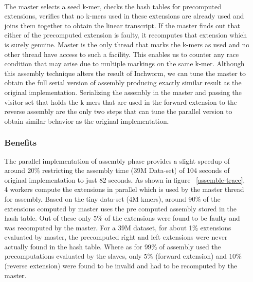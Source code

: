 \label{key}\documentclass[plainarticle, english ,zihtitle,final,hyperref,utf8]{zihpub}
\begin{document}
\paragraph{}
The master selects a seed k-mer, checks the hash tables for precomputed extensions, verifies that no k-mers used in these extensions are already used and joins them together to obtain the linear transcript. If the master finds out that either of the precomputed extension is faulty, it recomputes that extension which is surely genuine. Master is the only thread that marks the k-mers as used and no other thread have access to such a facility. This enables us to counter any race condition that may arise due to multiple markings on the same k-mer. Although this assembly technique alters the result of Inchworm, we can tune the master to obtain the full serial version of assembly producing exactly similar result as the original implementation. Serializing the assembly in the master and passing the visitor set that holds the k-mers that are used in the forward extension to the reverse assembly are the only two steps that can tune the parallel version to obtain similar behavior as the original implementation.
\subsubsection{Benefits}
The parallel implementation of assembly phase provides a slight speedup of around 20\% restricting the assembly time (39M Data-set) of 104 seconds of original implementation to just 82 seconds. As shown in figure ~\ref{assemble-trace}, 4 workers compute the extensions in parallel which is used by the master thread for assembly. Based on the tiny data-set (4M kmers), around 90\% of the extensions computed by master uses the pre computed assembly stored in the hash table. Out of these only 5\% of the extensions were found to be faulty and was recomputed by the master.  For a 39M dataset, for about 1\% extensions evaluated by master, the precomputed right and left extensions were never actually found in the hash table. Where as for 99\% of assembly used the precomputations evaluated by the slaves, only  5\% (forward extension) and 10\%(reverse extension) were found to be invalid and had to be recomputed by the master. 
\end{document}
